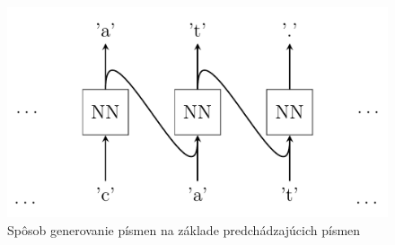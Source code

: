 	
			
	





\begin{figure}[H]
\begin{center}
\includegraphics[width=1.0\linewidth]{figures/model-2.png}
\caption{Spôsob generovanie písmen na základe predchádzajúcich písmen}
\label{fig:nn_gen}
\end{center}
\end{figure}



	
